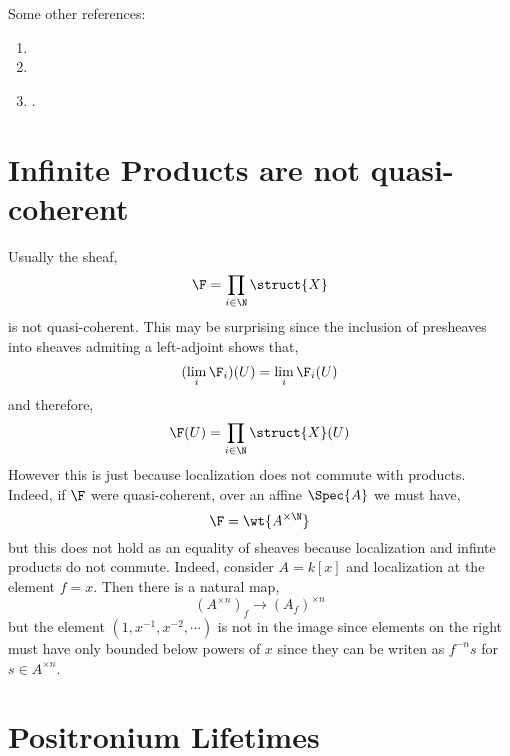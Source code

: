 \documentclass[12pt]{article}
\begin{document}
Some other references:

\begin{enumerate}
\item {}
\item {}

\item {}. 
\end{enumerate}

\section{Infinite Products are not quasi-coherent}

Usually the sheaf,
\[ \F = \prod_{i \in \N} \struct{X} \]
is not quasi-coherent. This may be surprising since the inclusion of presheaves into sheaves admiting a left-adjoint shows that,
\[ (\lim_i \F_i)(U) = \lim_i \F_i(U) \]
and therefore,
\[ \F(U) = \prod_{i \in \N} \struct{X}(U) \]
However this is just because localization does not commute with products. Indeed, if $\F$ were quasi-coherent, over an affine $\Spec{A}$ we must have,
\[ \F = \wt{A^{\times \N}} \]
but this does not hold as an equality of sheaves because localization and infinte products do not commute. Indeed, consider $A = k[x]$ and localization at the element $f = x$. Then there is a natural map,
\[ (A^{\times n})_f \to (A_f)^{\times n} \]
but the element $(1, x^{-1}, x^{-2}, \cdots)$ is not in the image since elements on the right must have only bounded below powers of $x$ since they can be writen as $f^{-n} s$ for $s \in A^{\times n}$. 

\section{Positronium Lifetimes}

\newcommand{\CM}{\mathrm{CM}}
\end{document}
